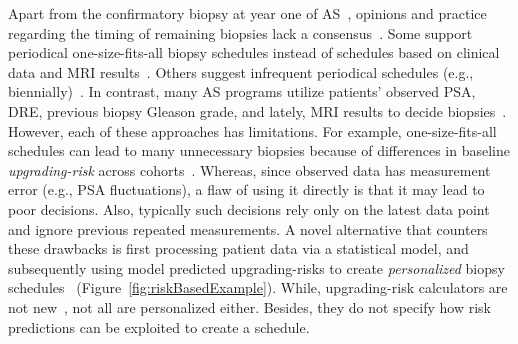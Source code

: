 Apart from the confirmatory biopsy at year one of AS~\citep{bokhorst2015compliance}, opinions and practice regarding the timing of remaining biopsies lack a consensus~\citep{nieboer2018active}. Some support periodical one-size-fits-all biopsy schedules instead of schedules based on clinical data and MRI results~\citep{chesnut2019role,loeb2014heterogeneity}. Others suggest infrequent periodical schedules (e.g., biennially)~\citep{inoue2018comparative,de2017estimating}. In contrast, many AS programs utilize patients' observed PSA, DRE, previous biopsy Gleason grade, and lately, MRI results to decide biopsies~\citep{kasivisvanathan2020magnetic,bul2013active,nieboer2018active}. However, each of these approaches has limitations. For example, one-size-fits-all schedules can lead to many unnecessary biopsies because of differences in baseline \emph{upgrading-risk} across cohorts~\citep{inoue2018comparative}. Whereas, since observed data has measurement error (e.g., PSA fluctuations), a flaw of using it directly is that it may lead to poor decisions. Also, typically such decisions rely only on the latest data point and ignore previous repeated measurements. A novel alternative that counters these drawbacks is first processing patient data via a statistical model, and subsequently using model predicted upgrading-risks to create \emph{personalized} biopsy schedules~\citep{nieboer2018active} (Figure~\ref{fig:riskBasedExample}). While, upgrading-risk calculators are not new~\citep{coley2017prediction,ankerst2015precision,partin1993use,makarov2007updated}, not all are personalized either. Besides, they do not specify how risk predictions can be exploited to create a schedule.


